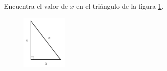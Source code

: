 \question[15]  Encuentra el valor de $x$ en el triángulo de la figura \ref{fig:lados_pitagoras_01}.
\begin{figure}[H]
    \begin{center}
        \includegraphics[width=0.2\textwidth]{../images/lados_pitagoras_01.png}
    \end{center}
    \caption{}
    \label{fig:lados_pitagoras_01}
\end{figure}